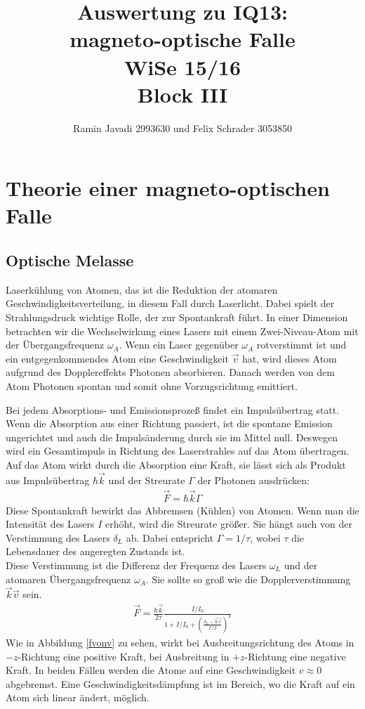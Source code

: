 \documentclass[12pt, a4paper]{article}
\title{Auswertung zu IQ13:\\
       magneto-optische Falle\\
       WiSe 15/16\\
       Block III}
\author{Ramin Javadi 2993630 und Felix Schrader 3053850}
\date{}
\begin{document}
\maketitle
\tableofcontents
\newpage
\section{Theorie einer magneto-optischen Falle}
  \subsection{Optische Melasse}
  Laserkühlung von Atomen, das ist die Reduktion der atomaren Geschwindigkeitsverteilung, in diesem Fall durch Laserlicht. Dabei spielt der Strahlungsdruck wichtige Rolle, der zur Spontankraft führt. In einer Dimension betrachten wir die Wechselwirkung eines Lasers mit einem Zwei-Niveau-Atom mit der Übergangsfrequenz ${\omega_A}$. Wenn ein Laser gegenüber ${\omega_A}$ rotverstimmt ist und ein entgegenkommendes Atom eine Geschwindigkeit ${\vec v}$ hat, wird dieses Atom aufgrund des Dopplereffekts Photonen absorbieren. Danach werden von dem Atom Photonen spontan und somit ohne Vorzugsrichtung emittiert.
  
  Bei jedem Absorptions- und Emissionsprozeß findet ein Impulsübertrag statt. Wenn die Absorption aus einer Richtung passiert, ist die spontane Emission ungerichtet und auch die Impulsänderung durch sie im Mittel null. Deswegen wird ein Gesamtimpuls in Richtung des Laserstrahles auf das Atom übertragen.
 \\Auf das Atom wirkt durch die Absorption eine Kraft, sie lässt sich als Produkt aus Impulsübertrag $\hbar\vec{k}$ und der Streurate $\Gamma$ der Photonen ausdrücken: 
   \begin{align*}
  \vec F=\hbar \vec k \Gamma
  \end{align*}
  Diese Spontankraft bewirkt das Abbremsen (Kühlen) von Atomen. Wenn man die Intensität des Lasers ${I}$ erhöht, wird die Streurate größer. Sie hängt auch von der Verstimmung des Lasers ${\delta_L}$ ab. Dabei entspricht ${\Gamma =1/ \tau}$, wobei ${\tau}$ die Lebensdauer des angeregten Zustands ist.
  \\Diese Verstimmung ist die Differenz der Frequenz des Lasers ${\omega_L}$ und der atomaren Übergangsfrequenz ${\omega_A}$. Sie sollte so groß wie die Dopplerverstimmung ${\vec k \vec v}$ sein.
   \begin{align*}
    \vec F=\frac{\hbar \vec k}{2 \tau} \frac{I/I_0}{1+I/I_0+(\frac{ \delta _L-\vec k \vec v}{\Gamma /2})^2}
  \end{align*}
  Wie in Abbildung \ref{fvonv} zu sehen, wirkt bei Ausbreitungsrichtung des Atoms in $-z$-Richtung eine positive Kraft, bei Ausbreitung in $+z$-Richtung eine negative Kraft. In beiden Fällen werden die Atome auf eine Geschwindigkeit ${v\approx 0}$ abgebremst. Eine Geschwindigkeitsdämpfung ist im Bereich, wo die Kraft auf ein Atom sich linear ändert, möglich.
  
\end{document}
